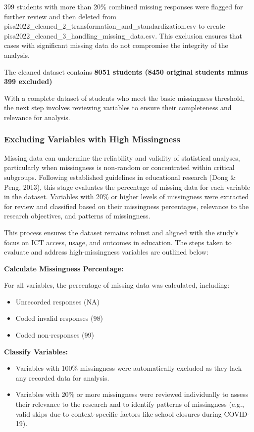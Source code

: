 \documentclass[
]{article}
\begin{document}
399 students with more than 20\% combined missing responses were flagged
for further review and then deleted from
pisa2022\_cleaned\_2\_transformation\_and\_standardization.csv to create
pisa2022\_cleaned\_3\_handling\_missing\_data.csv. This exclusion
ensures that cases with significant missing data do not compromise the
integrity of the analysis.

The cleaned dataset contains \textbf{8051 students (8450 original
students minus 399 excluded)}

With a complete dataset of students who meet the basic missingness
threshold, the next step involves reviewing variables to ensure their
completeness and relevance for analysis.

\hypertarget{excluding-variables-with-high-missingness}{%
\subsubsection{Excluding Variables with High
Missingness}\label{excluding-variables-with-high-missingness}}

Missing data can undermine the reliability and validity of statistical
analyses, particularly when missingness is non-random or concentrated
within critical subgroups. Following established guidelines in
educational research (Dong \& Peng, 2013), this stage evaluates the
percentage of missing data for each variable in the dataset. Variables
with 20\% or higher levels of missingness were extracted for review and
classified based on their missingness percentages, relevance to the
research objectives, and patterns of missingness.

This process ensures the dataset remains robust and aligned with the
study's focus on ICT access, usage, and outcomes in education. The steps
taken to evaluate and address high-missingness variables are outlined
below:

\textbf{Calculate Missingness Percentage:}

For all variables, the percentage of missing data was calculated,
including:

\begin{itemize}
\item
  Unrecorded responses (NA)
\item
  Coded invalid responses (98)
\item
  Coded non-responses (99)
\end{itemize}

\textbf{Classify Variables:}

\begin{itemize}
\item
  Variables with 100\% missingness were automatically excluded as they
  lack any recorded data for analysis.
\item
  Variables with 20\% or more missingness were reviewed individually to
  assess their relevance to the research and to identify patterns of
  missingness (e.g., valid skips due to context-specific factors like
  school closures during COVID-19).
\end{itemize}
\end{document}
